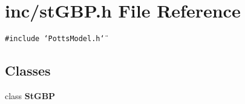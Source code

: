 \section{inc/stGBP.h File Reference}
\label{stGBP_8h}
{\tt \#include \char`\"{}PottsModel.h\char`\"{}}\par
\subsection*{Classes}
\begin{CompactItemize}
\item 
class {\bf StGBP}
\end{CompactItemize}

